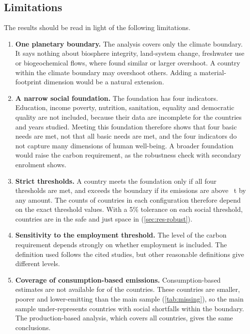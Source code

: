 \subsection{Limitations}

The results should be read in light of the following limitations.

\begin{enumerate}
\item \textbf{One planetary boundary.} The analysis covers only the climate boundary. It says nothing about biosphere integrity, land-system change, freshwater use or biogeochemical flows, where \citet{fanning2022} found similar or larger overshoot. A country within the climate boundary may overshoot others. Adding a material-footprint dimension \citep{oneill2018} would be a natural extension.

\item \textbf{A narrow social foundation.} The foundation has four indicators. Education, income poverty, nutrition, sanitation, equality and democratic quality are not included, because their data are incomplete for the countries and years studied. Meeting this foundation therefore shows that four basic needs are met, not that all basic needs are met, and the four indicators do not capture many dimensions of human well-being. A broader foundation would raise the carbon requirement, as the robustness check with secondary enrolment shows.

\item \textbf{Strict thresholds.} A country meets the foundation only if all four thresholds are met, and exceeds the boundary if its emissions are above \nBoundary~t by any amount. The counts of countries in each configuration therefore depend on the exact threshold values. With a 5\% tolerance on each social threshold, \nRobTolSafeYearN{} countries are in the safe and just space in \nLastYear{} (\cref{sec:res-robust}).

\item \textbf{Sensitivity to the employment threshold.} The level of the carbon requirement depends strongly on whether employment is included. The definition used follows the cited studies, but other reasonable definitions give different levels.

\item \textbf{Coverage of consumption-based emissions.} Consumption-based estimates are not available for \nMissOutN{} of the \nNCountries{} countries. These countries are smaller, poorer and lower-emitting than the main sample (\cref{tab:missing}), so the main sample under-represents countries with social shortfalls within the boundary. The production-based analysis, which covers all countries, gives the same conclusions.


\end{enumerate}
